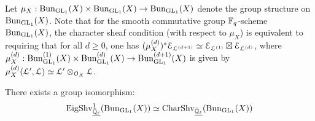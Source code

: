             \begin{remark} \label{remark: character_sheaf_condition_for_BunGL1}
                Let $\mu_X: \Bun_{\GL_1}(X) \x \Bun_{\GL_1}(X) \to \Bun_{\GL_1}(X)$ denote the group structure on $\mathrm{Bun}_{\operatorname{GL}_1}(X)$. Note that for the smooth commutative group $\mathbb{F}_q$-scheme $\mathrm{Bun}_{\operatorname{GL}_1}(X)$, the character sheaf condition (with respect to $\mu_X$) is equivalent to requiring that for all $d \geq 0$, one has $(\mu_X^{(d)})^*\mathcal{E}_{\mathcal{L}^{(d + 1)}} \simeq \mathcal{E}_{\mathcal{L}^{(1)}} \boxtimes \mathcal{E}_{\mathcal{L}^{(d)}}$, where $\mu_X^{(d)}: \Bun_{\GL_1}^{(1)}(X) \x \Bun_{\GL_1}^{(d)}(X) \to \Bun_{\GL_1}^{(d + 1)}(X)$ is given by $\mu_X^{(d)}(\calL', \calL) \cong \calL' \tensor_{\calO_X} \calL$. 
            \end{remark}
            \begin{lemma} \label{lemma: hecke_eigensheaves_are_character_sheaves}
                There exists a group isomorphism:
                    $$\mathrm{Eig}\mathrm{Shv}_{\underline{\bar{\mathbb{Q}}_{\ell}}}^1(\mathrm{Bun}_{\operatorname{GL}_1}(X)) \simeq \mathrm{Char}\mathrm{Shv}_{\underline{\bar{\mathbb{Q}}_{\ell}}}(\mathrm{Bun}_{\operatorname{GL}_1}(X))$$
            \end{lemma}
